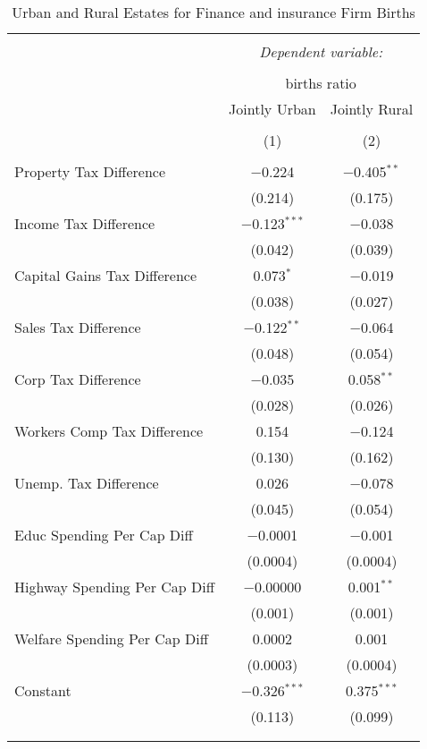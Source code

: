 
\begin{table}[!htbp] \centering 
  \caption{Urban and Rural Estates for  Finance and insurance Firm Births} 
  \label{} 
\begin{tabular}{@{\extracolsep{5pt}}lcc} 
\\[-1.8ex]\hline 
\hline \\[-1.8ex] 
 & \multicolumn{2}{c}{\textit{Dependent variable:}} \\ 
\cline{2-3} 
\\[-1.8ex] & \multicolumn{2}{c}{births ratio} \\ 
 & Jointly Urban & Jointly Rural \\ 
\\[-1.8ex] & (1) & (2)\\ 
\hline \\[-1.8ex] 
 Property Tax Difference & $-$0.224 & $-$0.405$^{**}$ \\ 
  & (0.214) & (0.175) \\ 
  Income Tax Difference & $-$0.123$^{***}$ & $-$0.038 \\ 
  & (0.042) & (0.039) \\ 
  Capital Gains Tax Difference & 0.073$^{*}$ & $-$0.019 \\ 
  & (0.038) & (0.027) \\ 
  Sales Tax Difference & $-$0.122$^{**}$ & $-$0.064 \\ 
  & (0.048) & (0.054) \\ 
  Corp Tax Difference & $-$0.035 & 0.058$^{**}$ \\ 
  & (0.028) & (0.026) \\ 
  Workers Comp Tax Difference & 0.154 & $-$0.124 \\ 
  & (0.130) & (0.162) \\ 
  Unemp. Tax Difference & 0.026 & $-$0.078 \\ 
  & (0.045) & (0.054) \\ 
  Educ Spending Per Cap Diff & $-$0.0001 & $-$0.001 \\ 
  & (0.0004) & (0.0004) \\ 
  Highway Spending Per Cap Diff & $-$0.00000 & 0.001$^{**}$ \\ 
  & (0.001) & (0.001) \\ 
  Welfare Spending Per Cap Diff & 0.0002 & 0.001 \\ 
  & (0.0003) & (0.0004) \\ 
  Constant & $-$0.326$^{***}$ & 0.375$^{***}$ \\ 
  & (0.113) & (0.099) \\ 
 \hline \\[-1.8ex] 
\hline 
\hline \\[-1.8ex] 
\end{tabular} 
\end{table} 
